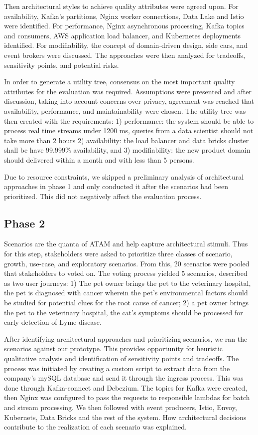 \documentclass[a4paper,11pt]{article}
\begin{document}
Then architectural styles to achieve quality attributes were agreed upon. For availability, Kafka's partitions, Nginx worker connections, Data Lake and Istio were identified.  For performance, Nginx asynchronous processing, Kafka topics and consumers, AWS application load balancer, and Kubernetes deployments identified. For modifiability, the concept of domain-driven design, side cars, and event brokers were discussed. The approaches were then analyzed for tradeoffs, sensitivity points, and potential risks. 

In order to generate a utility tree, consensus on the most important quality attributes for the evaluation was required. Assumptions were presented and after discussion, taking into account concerns over privacy, agreement was reached that availability, performance, and maintainability were chosen. The utility tree was then created with the requirements: 1) performance: the system should be able to process real time streams under 1200 ms, queries from a data scientist should not take more than 2 hours 2) availability: the load balancer and data bricks cluster shall be have 99.999\% availability, and 3) modifiability: the new product domain should delivered within a month and with less than 5 persons.

Due to resource constraints, we skipped a preliminary analysis of architectural approaches in phase 1 and only conducted it after the scenarios had been prioritized. This did not negatively affect the evaluation process.



\subsection{Phase 2}
\nobreak{}
Scenarios are the quanta of ATAM and help capture architectural stimuli. Thus for this step, stakeholders were asked to prioritize three classes of scenario, growth, use-case, and exploratory scenarios. From this, 20 scenarios were pooled that stakeholders to voted on. The voting process yielded 5 scenarios, described as two user journeys: 1) The pet owner brings the pet to the veterinary hospital, the pet is diagnosed with cancer wherein the pet's environmental factors should be studied for potential clues for the root cause of cancer; 2) a pet owner brings the pet to the veterinary hospital, the cat's symptoms should be processed for early detection of Lyme disease. 

After identifying architectural approaches and prioritizing scenarios, we ran the scenarios against our prototype. This provides opportunity for heuristic qualitative analysis and identification of sensitivity points and tradeoffs. The process was initiated by creating a custom script to extract data from the company's mySQL database and send it through the ingress process. This was done through Kafka-connect and Debezium. The topics for Kafka were created, then Nginx was configured to pass the requests to responsible lambdas for batch and stream processing. We then followed with event producers, Istio, Envoy, Kubernets, Data Bricks and the rest of the system. How architectural decisions contribute to the realization of each scenario was explained.
\end{document}
